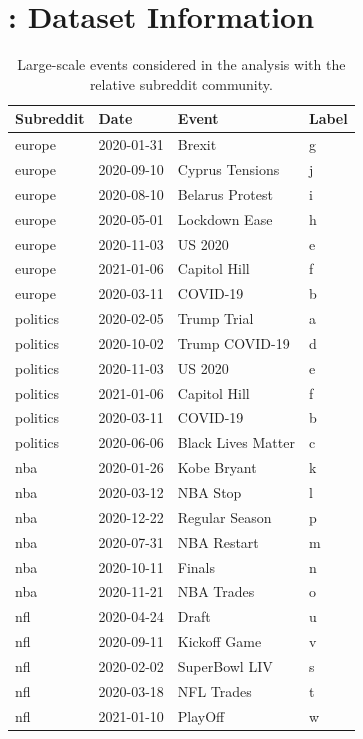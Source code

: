 \documentclass[fleqn,10pt]{wlscirep}
\begin{document}
\section{: Dataset Information}\label{sm_dataset_info}
%
\begin{table}[h!]
	\centering
    \begin{tabular}{llll}
    \toprule
    {\textbf{Subreddit}} & {\textbf{Date}} & {\textbf{Event}} & {\textbf{Label}}\\
    \midrule
       europe & 2020-01-31 &               Brexit & g\\
       europe & 2020-09-10 &     Cyprus Tensions & j \\
       europe & 2020-08-10 &     Belarus Protest & i \\
       europe & 2020-05-01 &       Lockdown Ease & h \\
       europe & 2020-11-03 &              US 2020 & e \\
       europe & 2021-01-06 &        Capitol Hill & f \\
       europe & 2020-03-11 &             COVID-19 & b \\
     politics & 2020-02-05 &         Trump Trial & a\\
     politics & 2020-10-02 &      Trump COVID-19 & d\\
     politics & 2020-11-03 &              US 2020 & e \\
     politics & 2021-01-06 &        Capitol Hill & f \\
     politics & 2020-03-11 &             COVID-19 & b \\
     politics & 2020-06-06 & Black Lives Matter & c\\
          nba & 2020-01-26 &         Kobe Bryant & k \\
          nba & 2020-03-12 &            NBA Stop & l \\
          nba & 2020-12-22 &      Regular Season & p \\
          nba & 2020-07-31 &         NBA Restart & m \\
          nba & 2020-10-11 &               Finals & n \\
          nba & 2020-11-21 &          NBA Trades  & o \\
          nfl & 2020-04-24 &                Draft & u \\
          nfl & 2020-09-11 &        Kickoff Game  & v \\
          nfl & 2020-02-02 &       SuperBowl LIV & s \\
          nfl & 2020-03-18 &          NFL Trades & t \\
          nfl & 2021-01-10 &              PlayOff & w  \\
    \bottomrule
    \end{tabular}
    \caption{Large-scale events considered in the analysis with the relative subreddit community.} 
\label{tab_sm_data_events}
\end{table}
\end{document}
